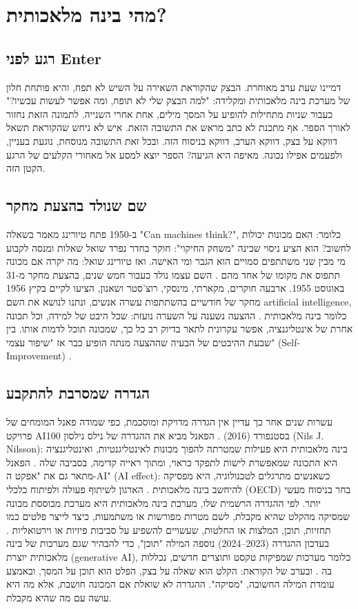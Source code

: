 \chapter{מהי בינה מלאכותית?}\label{ch:01}
\section{רגע לפני Enter}
דמיינו שעת ערב מאוחרת. הבצק שהקוראת השאירה על השיש לא תפח, והיא פותחת חלון של מערכת בינה מלאכותית ומקלידה: "למה הבצק שלי לא תופח, ומה אפשר לעשות עכשיו?" כעבור שניות מתחילות להופיע על המסך מילים, אחת אחרי השנייה. לתמונה הזאת נחזור לאורך הספר.
אף מתכנת לא כתב מראש את התשובה הזאת. איש לא ניחש שהקוראת תשאל דווקא על בצק, דווקא הערב, דווקא בניסוח הזה. ובכל זאת התשובה מנוסחת, נוגעת בעניין, ולפעמים אפילו נכונה. מאיפה היא הגיעה?
הספר יוצא למסע אל מאחורי הקלעים של הרגע הקטן הזה.
\section{שם שנולד בהצעת מחקר}
ב-1950 פתח טיורינג מאמר בשאלה "Can machines think?", כלומר: האם מכונות יכולות לחשוב? הוא הציע ניסוי שכינה "משחק החיקוי": חוקר בחדר נפרד שואל שאלות ומנסה לקבוע מי מבין שני משתתפים סמויים הוא הגבר ומי האישה. ואז טיורינג שואל: מה יקרה אם מכונה תתפוס את מקומו של אחד מהם \cite{S-ch01-02}.
השם עצמו נולד כעבור חמש שנים, בהצעת מחקר מ-31 באוגוסט 1955. ארבעה חוקרים, מקארתי, מינסקי, רוצ'סטר ושאנון, הציעו לקיים בקיץ 1956 מחקר של חודשיים בהשתתפות עשרה אנשים, ונתנו לנושא את השם artificial intelligence, כלומר בינה מלאכותית \cite{S-ch01-01}. ההצעה נשענה על השערה נועזת: שכל היבט של למידה, וכל תכונה אחרת של אינטליגנציה, אפשר עקרונית לתאר בדיוק רב כל כך, שמכונה תוכל לדמות אותו. בין שבעת ההיבטים של הבעיה שההצעה מנתה הופיע כבר אז "שיפור עצמי" (Self-Improvement) \cite{S-ch01-01}.
\section{הגדרה שמסרבת להתקבע}
עשרות שנים אחר כך עדיין אין הגדרה מדויקת ומוסכמת, כפי שמודה פאנל המומחים של פרויקט AI100 בסטנפורד (2016) \cite{S-ch01-07}. הפאנל מביא את ההגדרה של נילס נילסון (Nils J. Nilsson): בינה מלאכותית היא פעילות שמטרתה להפוך מכונות לאינטליגנטיות, ואינטליגנציה היא התכונה שמאפשרת לישות לתפקד כראוי, ומתוך ראייה קדימה, בסביבה שלה \cite{S-ch01-07}. הפאנל מתאר גם את "אפקט ה-AI" (AI effect): כשאנשים מתרגלים לטכנולוגיה, היא מפסיקה להיחשב בינה מלאכותית \cite{S-ch01-07}.
הארגון לשיתוף פעולה ולפיתוח כלכלי (OECD) בחר בניסוח מעשי יותר. לפי ההגדרה הרשמית שלו, מערכת בינה מלאכותית היא מערכת מבוססת מכונה שמסיקה מהקלט שהיא מקבלת, לשם מטרות מפורשות או משתמעות, כיצד לייצר פלטים כמו תחזיות, תוכן, המלצות או החלטות, שעשויים להשפיע על סביבות פיזיות או וירטואליות \cite{S-ch01-09}. בעדכון ההגדרה (2023–2024) נוספה המילה "תוכן", כדי להבהיר שגם מערכות של בינה מלאכותית יוצרת (generative AI), כלומר מערכות שמפיקות טקסט ותוצרים חדשים, נכללות בה \cite{S-ch01-10}.
ובערב של הקוראת: הקלט הוא שאלה על בצק, הפלט הוא תוכן על המסך, ובאמצע עומדת המילה החשובה, "מסיקה". ההגדרה לא שואלת אם המכונה חושבת, אלא מה היא עושה עם מה שהיא מקבלת.
